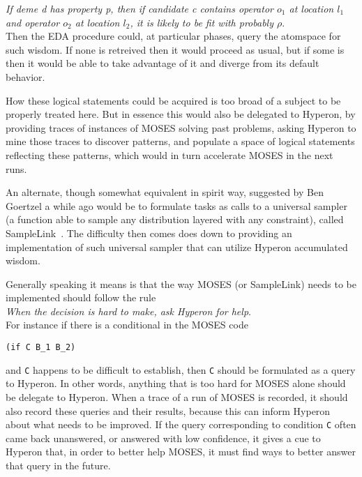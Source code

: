 \documentclass[]{report}
\begin{document}
\emph{If deme d has property p, then if candidate c contains operator $o_1$ at
location $l_1$ and operator $o_2$ at location $l_2$, it is likely to
be fit with probably $\rho$}.\\

Then the EDA procedure could, at particular phases, query the
atomspace for such wisdom.  If none is retreived then it would proceed
as usual, but if some is then it would be able to take advantage of it
and diverge from its default behavior.

How these logical statements could be acquired is too broad of a
subject to be properly treated here.  But in essence this would also
be delegated to Hyperon, by providing traces of instances of MOSES
solving past problems, asking Hyperon to mine those traces to discover
patterns, and populate a space of logical statements reflecting these
patterns, which would in turn accelerate MOSES in the next runs.

An alternate, though somewhat equivalent in spirit way, suggested by
Ben Goertzel a while ago would be to formulate tasks as calls to a
universal sampler (a function able to sample any distribution layered
with any constraint), called SampleLink~\cite{SampleLink}.  The
difficulty then comes does down to providing an implementation of such
universal sampler that can utilize Hyperon accumulated wisdom.

Generally speaking it means is that the way MOSES (or SampleLink)
needs to be implemented should follow the rule\\

\emph{When the decision is hard to make, ask Hyperon for help}.\\

For instance if there is a conditional in the MOSES code

\begin{verbatim}
(if C B_1 B_2)
\end{verbatim}

and \texttt{C} happens to be difficult to establish, then \texttt{C}
should be formulated as a query to Hyperon.  In other words, anything
that is too hard for MOSES alone should be delegate to Hyperon.  When
a trace of a run of MOSES is recorded, it should also record these
queries and their results, because this can inform Hyperon about what
needs to be improved.  If the query corresponding to
condition \texttt{C} often came back unanswered, or answered with low
confidence, it gives a cue to Hyperon that, in order to better help
MOSES, it must find ways to better answer that query in the future.
\end{document}

